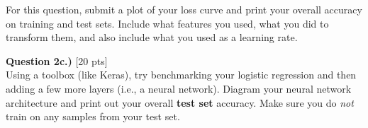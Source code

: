 \documentclass[paper=a4, fontsize=11pt]{scrartcl} %
\begin{document}
For this question, submit a plot of your loss curve and print your overall accuracy on training and test sets. Include what features you used, what you did to transform them, and also include what you used as a learning rate.

\vspace{1cm}
{\Large \textbf{Question 2c.) }[20 pts] } \\

Using a toolbox (like Keras), try benchmarking your logistic regression and then adding a few more layers (i.e., a neural network). Diagram your neural network architecture and print out your overall \textbf{test set} accuracy. Make sure you do \emph{not} train on any samples from your test set.
\end{document}
